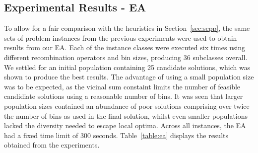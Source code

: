 \documentclass[authoryear]{elsarticle}
\begin{document}
\subsection{Experimental Results - EA}
\label{sub:expea}
\noindent To allow for a fair comparison with the heuristics in Section~\ref{sec:scpp}, the same sets of problem instances from the previous experiments were used to obtain results from our EA. Each of the instance classes were executed six times using different recombination operators and bin sizes, producing 36 subclasses overall. We settled for an initial population containing 25 candidate solutions, which was shown to produce the best results. The advantage of using a small population size was to be expected, as the vicinal sum constaint limits the number of feasible candidiate solutions using a reasonable number of bins. It was seen that larger population sizes contained an abundance of poor solutions comprising over twice the number of bins as used in the final solution, whilst even smaller populations lacked the diversity needed to escape local optima. Across all instances, the EA had a fixed time limit of 300 seconds. Table~\ref{table:ea} displays the results obtained from the experiments.
\end{document}
